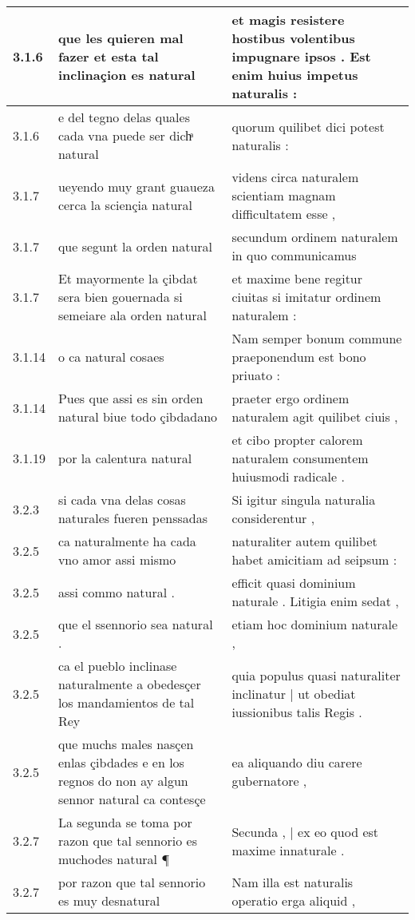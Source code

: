 \begin{tabular}{|p{1cm}|p{6.5cm}|p{6.5cm}|}
3.1.6 & que les quieren mal fazer et esta tal inclinaçion es natural & et magis resistere hostibus volentibus impugnare ipsos . Est enim huius impetus naturalis : \\\hline
3.1.6 & e del tegno delas quales cada vna puede ser dichͣ natural & quorum quilibet dici potest naturalis : \\\hline
3.1.7 & ueyendo muy grant guaueza cerca la sciençia natural & videns circa naturalem scientiam magnam difficultatem esse , \\\hline
3.1.7 & que segunt la orden natural & secundum ordinem naturalem in quo communicamus \\\hline
3.1.7 & Et mayormente la çibdat sera bien gouernada si semeiare ala orden natural & et maxime bene regitur ciuitas si imitatur ordinem naturalem : \\\hline
3.1.14 & o ca natural cosaes & Nam semper bonum commune praeponendum est bono priuato : \\\hline
3.1.14 & Pues que assi es sin orden natural biue todo çibdadano & praeter ergo ordinem naturalem agit quilibet ciuis , \\\hline
3.1.19 & por la calentura natural & et cibo propter calorem naturalem consumentem huiusmodi radicale . \\\hline
3.2.3 & si cada vna delas cosas naturales fueren penssadas & Si igitur singula naturalia considerentur , \\\hline
3.2.5 & ca naturalmente ha cada vno amor assi mismo & naturaliter autem quilibet habet amicitiam ad seipsum : \\\hline
3.2.5 & assi commo natural . & efficit quasi dominium naturale . Litigia enim sedat , \\\hline
3.2.5 & que el ssennorio sea natural . & etiam hoc dominium naturale , \\\hline
3.2.5 & ca el pueblo inclinase naturalmente a obedesçer los mandamientos de tal Rey & quia populus quasi naturaliter inclinatur | ut obediat iussionibus talis Regis . \\\hline
3.2.5 & que muchs males nasçen enlas çibdades e en los regnos do non ay algun sennor natural ca contesçe & ea aliquando diu carere gubernatore , \\\hline
3.2.7 & La segunda se toma por razon que tal sennorio es muchodes natural ¶ & Secunda , | ex eo quod est maxime innaturale . \\\hline
3.2.7 & por razon que tal sennorio es muy desnatural & Nam illa est naturalis operatio erga aliquid , \\\hline

\end{tabular}
